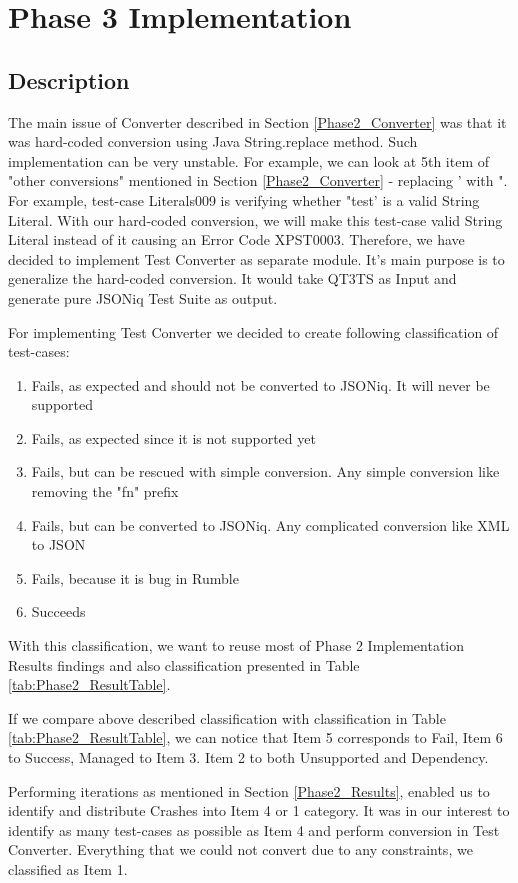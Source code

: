 \section{Phase 3 Implementation}
\subsection{Description}
\label{Phase3_Description}
The main issue of Converter described in Section \ref{Phase2_Converter} was that it was hard-coded conversion using Java String.replace method. Such implementation can be very unstable. For example, we can look at 5th item of "other conversions" mentioned in Section \ref{Phase2_Converter} - replacing ' with ". For example, test-case Literals009 is verifying whether "test' is a valid String Literal. With our hard-coded conversion, we will make this test-case valid String Literal instead of it causing an Error Code XPST0003. Therefore, we have decided to implement Test Converter as separate module. It's main purpose is to generalize the hard-coded conversion. It would take QT3TS as Input and generate pure JSONiq Test Suite as output.

For implementing Test Converter we decided to create following classification of test-cases:
\begin{enumerate}
	\item Fails, as expected and should not be converted to JSONiq. It will never be supported
	\item Fails, as expected since it is not supported yet
	\item Fails, but can be rescued with simple conversion. Any simple conversion like removing the "fn" prefix 
	\item Fails, but can be converted to JSONiq. Any complicated conversion like XML to JSON
	\item Fails, because it is bug in Rumble
	\item Succeeds
\end{enumerate}

With this classification, we want to reuse most of Phase 2 Implementation Results findings and also classification presented in Table \ref{tab:Phase2_ResultTable}.

If we compare above described classification with classification in Table \ref{tab:Phase2_ResultTable}, we can notice that Item 5 corresponds to Fail, Item 6 to Success, Managed to Item 3. Item 2 to both Unsupported and Dependency. 

Performing iterations as mentioned in Section \ref{Phase2_Results}, enabled us to identify and distribute Crashes into Item 4 or 1 category. It was in our interest to identify as many test-cases as possible as Item 4 and perform conversion in Test Converter. Everything that we could not convert due to any constraints, we classified as Item 1. 

